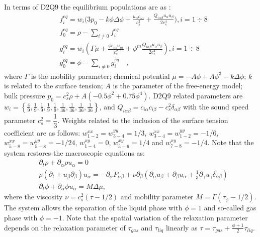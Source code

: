 \documentclass{article}
\begin{document}
In terms of D2Q9 the equilibrium populations are as \cite{pooley-contact}:
\begin{equation}
\begin{aligned}
&f_i^{eq}=w_i 
\biggl(3
p_0 - k \phi \Delta \phi
+\frac{u_{\alpha}c_{i\alpha}}{c_s^2}+\frac{Q_{i\alpha\beta}u_{\alpha } u_ {
\beta}}{2 c_s^4}\biggr), i=1\div8\\
&f_0^{eq}=\rho-\sum_{i\neq0}{f_i^{eq}}\\
&g_i^{eq}=w_i(\Gamma \mu + \frac{\phi c_{i\alpha} u_{i\alpha}}{c_s^2}+\phi^m
\frac{Q_{i\alpha\beta}u_{\alpha}u_{\beta}}{2 c_s^4}), i=1\div8 \\
&g_0^{eq}=\phi-\sum_{i\neq0}{g_i^{eq}}\quad,
\end{aligned}
\end{equation}
where $\Gamma$ is the mobility parameter; chemical potential
$\mu=-A\phi+A\phi^3-k\Delta\phi$; $k$ is related to the surface
tension; $A$ is the parameter of the free-energy model; bulk pressure
$p_0=c_s^2 \rho +A (-0.5 \phi^2+0.75 \phi^4)$. D2Q9 related parameters are
$w_i=\left\{\frac{4}{9},\frac{1}{9},\frac{1}{9},\frac{1}{9},\frac{1}{9},
\frac{1}{36},\frac{1}{36},\frac{1}{36},\frac{1}{36}\right\}$, and
$Q_{i\alpha\beta}=c_{i\alpha} c_{i\beta} - c_s^2 \delta_{\alpha\beta}$ with
the sound speed parameter $c_s^2=\dfrac{1}{3}$. Weights related to the
inclusion of the surface tension coefficient are as follows:
$w^{xx}_{1-2}=w^{yy}_{3-4}=1/3$, $w^{xx}_{3-4}=w^{yy}_{1-2}=-1/6$,
$w^{xx}_{5-8}=w^{yy}_{5-8}=-1/24$, $w^{xy}_{1-4}=0$, $w^{xy}_{5-6}=1/4$ and
$w^{xy}_{7-8}=-1/4$. Note that the system restores the macroscopic
equations as:
\begin{equation}
\begin{aligned}
&\partial_t \rho+ \partial_{\alpha} \rho u_{\alpha}=0\\
&\rho\left(\partial_t+u_{\beta}\partial_{\beta}\right) u_{\alpha}=
-\partial_{\alpha}P_{\alpha \beta} +
\nu\partial_{\beta}\left(\partial_{\alpha}u_{\beta}+\partial_{\beta} u_{\alpha}
+ \frac{1}{3}\partial_{\gamma} u_{\gamma} \delta_{\alpha\beta}\right)\\
&\partial_t \phi + \partial_{\alpha} \phi u_{\alpha}=M \Delta \mu,
\end{aligned}
\label{binary:fluid:system}
\end{equation}
where the viscosity $\nu=c_s^2 (\tau-1/2)$ and mobility parameter
$M=\Gamma(\tau_{\phi}-1/2)$. The system allows the separation of the liquid
phase with $\phi=1$ and so-called gas phase with $\phi=-1$. Note that the
spatial variation of the relaxation parameter depends on the relaxation
parameter of $\tau_{gas}$ and $\tau_{liq}$ linearly as
$\tau=\tau_{gas}+\frac{\phi+1}{2}\tau_{liq}$.
\end{document}

